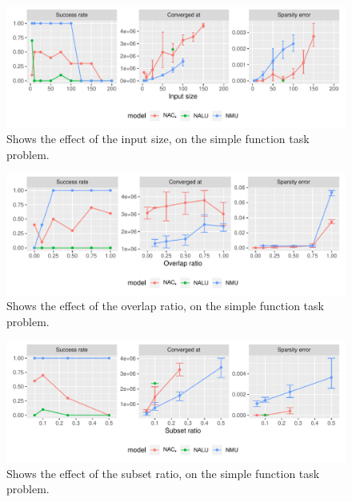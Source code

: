 \begin{figure}[H]
\centering
\includegraphics[width=\linewidth]{results/simple_function_static_input_size.pdf}
\caption{Shows the effect of the input size, on the simple function task problem.}
\label{fig:simple-fnction-static-input-size}
\end{figure}

\begin{figure}[h]
\centering
\includegraphics[width=\linewidth]{results/simple_function_static_overlap.pdf}
\caption{Shows the effect of the overlap ratio, on the simple function task problem.}
\label{fig:simple-fnction-static-overlap}
\end{figure}

\begin{figure}[h]
\centering
\includegraphics[width=\linewidth]{results/simple_function_static_subset.pdf}
\caption{Shows the effect of the subset ratio, on the simple function task problem.}
\label{fig:simple-fnction-static-subset}
\end{figure}


